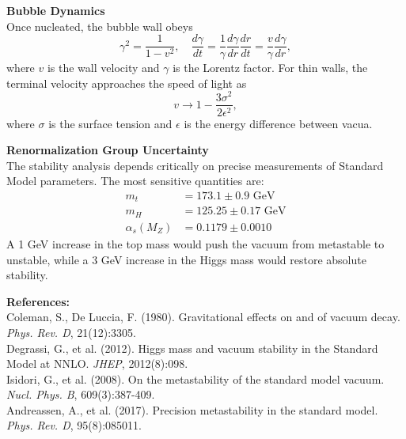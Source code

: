 \begin{technical}
\textbf{Bubble Dynamics}\\[0.5em]
Once nucleated, the bubble wall obeys
$$
\gamma^2 = \frac{1}{1-v^2}, \quad \frac{d\gamma}{dt} = \frac{1}{\gamma}\frac{d\gamma}{dr}\frac{dr}{dt} = \frac{v}{\gamma}\frac{d\gamma}{dr},
$$
where $v$ is the wall velocity and $\gamma$ is the Lorentz factor. For thin walls, the terminal velocity approaches the speed of light as
$$
v \to 1 - \frac{3\sigma^2}{2\epsilon^2},
$$
where $\sigma$ is the surface tension and $\epsilon$ is the energy difference between vacua.

\textbf{Renormalization Group Uncertainty}\\[0.5em]
The stability analysis depends critically on precise measurements of Standard Model parameters. The most sensitive quantities are:
\begin{align}
m_t &= 173.1 \pm 0.9 \text{ GeV} \\
m_H &= 125.25 \pm 0.17 \text{ GeV} \\
\alpha_s(M_Z) &= 0.1179 \pm 0.0010
\end{align}
A 1 GeV increase in the top mass would push the vacuum from metastable to unstable, while a 3 GeV increase in the Higgs mass would restore absolute stability.

\vspace{0.5em}
\textbf{References:}\\
Coleman, S., De Luccia, F. (1980). Gravitational effects on and of vacuum decay. \textit{Phys. Rev. D}, 21(12):3305.\\
Degrassi, G., et al. (2012). Higgs mass and vacuum stability in the Standard Model at NNLO. \textit{JHEP}, 2012(8):098.\\
Isidori, G., et al. (2008). On the metastability of the standard model vacuum. \textit{Nucl. Phys. B}, 609(3):387-409.\\
Andreassen, A., et al. (2017). Precision metastability in the standard model. \textit{Phys. Rev. D}, 95(8):085011.
\end{technical}
